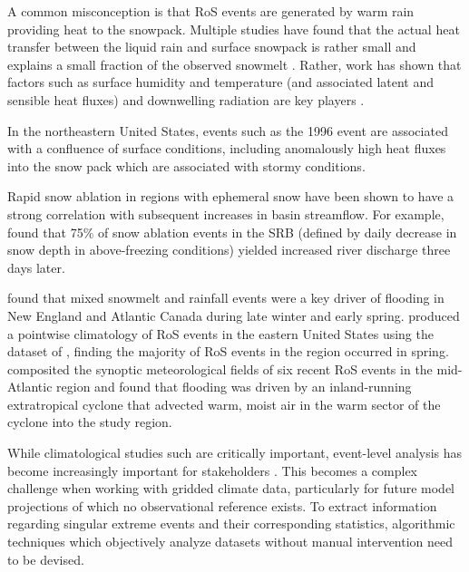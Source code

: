 \documentclass[draft]{agujournal2019}
\begin{document}
A common misconception is that RoS events are generated by warm rain providing heat to the snowpack. Multiple studies have found that the actual heat transfer between the liquid rain and surface snowpack is rather small and explains a small fraction of the observed snowmelt \citep{moore1984controls}. Rather, work has shown that factors such as surface humidity and temperature (and associated latent and sensible heat fluxes) and downwelling radiation are key players \citep{wurzer2016influence,harpold2018humidity}.

In the northeastern United States, events such as the 1996 event are associated with a confluence of surface conditions, including anomalously high heat fluxes into the snow pack which are associated with stormy conditions.

Rapid snow ablation in regions with ephemeral snow have been shown to have a strong correlation with subsequent increases in basin streamflow. For example, \citet{suriano2020discharge} found that 75\% of snow ablation events in the SRB (defined by daily decrease in snow depth in above-freezing conditions) yielded increased river discharge three days later.





\citet{collins2014annual} found that mixed snowmelt and rainfall events were a key driver of flooding in New England and Atlantic Canada during late winter and early spring. \citet{wachowicz2020rain} produced a pointwise climatology of RoS events in the eastern United States using the dataset of \citet{dyer2006spatial}, finding the majority of RoS events in the region occurred in spring. \citet{grote2021synoptic} composited the synoptic meteorological fields of six recent RoS events in the mid-Atlantic region and found that flooding was driven by an inland-running extratropical cyclone that advected warm, moist air in the warm sector of the cyclone into the study region.

While climatological studies such \citet{wachowicz2020rain} are critically important, event-level analysis has become increasingly important for stakeholders \citep{shepherd2018storylines}. This becomes a complex challenge when working with gridded climate data, particularly for future model projections of which no observational reference exists. To extract information regarding singular extreme events and their corresponding statistics, algorithmic techniques which objectively analyze datasets without manual intervention need to be devised.
\end{document}
